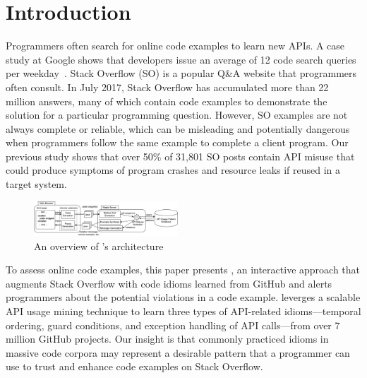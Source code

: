 \section{Introduction}
\label{sec:intro}
Programmers often search for online code examples to learn new APIs. A case study at Google shows that developers issue an average of 12 code search queries per weekday~\cite{sadowski2015developers}. Stack Overflow (SO) is a popular Q\&A website that programmers often consult. In July 2017, Stack Overflow has accumulated more than 22 million answers, many of which contain code examples to demonstrate the solution for a particular programming question. However, SO examples are not always complete or reliable, which can be misleading and potentially dangerous when programmers follow the same example to complete a client program. Our previous study shows that over 50\% of 31,801 SO posts contain API misuse that could produce symptoms of program crashes and resource leaks if reused in a target system. %

\begin{figure}
\includegraphics[width=0.48\textwidth]{maple-extension-v1.pdf}
\vspace{.1in}
\caption{An overview of {\soa}'s architecture}
\label{fig:arch}
\end{figure}

To assess online code examples, this paper presents {\soa}, an interactive approach that augments Stack Overflow with code idioms learned from GitHub and alerts programmers about the potential violations in a code example. {\soa} leverges a scalable API usage mining technique to learn three types of API-related idioms---temporal ordering, guard conditions, and exception handling of API calls---from over 7 million GitHub projects. Our insight is that commonly practiced idioms in massive code corpora may represent a desirable pattern that a programmer can use to trust and enhance code examples on Stack Overflow. 

